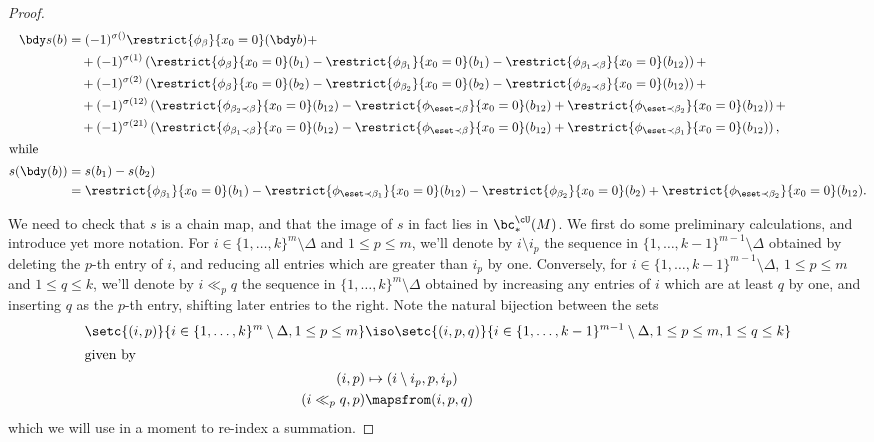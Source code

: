 \begin{proof}
\begin{align*}
\bdy s(b) & =  (-1)^{\sigma()} \restrict{\phi_{\beta}}{x_0 = 0}(\bdy b) + \\
	& \quad + (-1)^{\sigma(1)} \left( \restrict{\phi_{\beta}}{x_0 = 0}(b_1) - \restrict{\phi_{\beta_1}}{x_0 = 0}(b_1) - \restrict{\phi_{\beta_1 \prec \beta}}{x_0 = 0}(b_{12}) \right) + \\
	& \quad + (-1)^{\sigma(2)} \left( \restrict{\phi_{\beta}}{x_0 = 0}(b_2) - \restrict{\phi_{\beta_2}}{x_0 = 0}(b_2) - \restrict{\phi_{\beta_2 \prec \beta}}{x_0 = 0}(b_{12}) \right) + \\
	& \quad + (-1)^{\sigma(12)} \left( \restrict{\phi_{\beta_2 \prec \beta}}{x_0 = 0}(b_{12}) - \restrict{\phi_{\eset \prec \beta}}{x_0 = 0}(b_{12}) + \restrict{\phi_{\eset \prec \beta_2}}{x_0 = 0}(b_{12}) \right) + \\ 
	& \quad + (-1)^{\sigma(21)} \left( \restrict{\phi_{\beta_1 \prec \beta}}{x_0 = 0}(b_{12}) - \restrict{\phi_{\eset  \prec \beta}}{x_0 = 0}(b_{12}) + \restrict{\phi_{\eset \prec \beta_1}}{x_0 = 0}(b_{12}) \right), \\
\intertext{while}
s(\bdy(b)) & = s(b_1) - s(b_2) \\
		& = \restrict{\phi_{\beta_1}}{x_0=0}(b_1) - \restrict{\phi_{\eset \prec \beta_1}}{x_0=0}(b_{12}) - \restrict{\phi_{\beta_2}}{x_0=0}(b_2) + \restrict{\phi_{\eset \prec \beta_2}}{x_0=0}(b_{12}) .
\end{align*}

We need to check that $s$ is a chain map, and that \todo{} the image of $s$ in fact lies in $\bc^{\cU}_*(M)$.
We first do some preliminary calculations, and introduce yet more notation. For $i \in \{1, \ldots, k\}^{m} \setminus \Delta$ and $1 \leq p \leq m$, we'll denote by $i \setminus i_p$ the sequence in $\{1, \ldots, k-1\}^{m-1} \setminus \Delta$ obtained by deleting the $p$-th entry of $i$, and reducing all entries which are greater than $i_p$ by one. Conversely, for $i \in \{1, \ldots, k-1\}^{m-1} \setminus \Delta$, $1 \leq p \leq m$ and $1 \leq q \leq k$, we'll denote by $i \ll_p q$ the sequence in $\{1, \ldots, k\}^{m} \setminus \Delta$ obtained by increasing any entries of $i$ which are at least $q$ by one, and inserting $q$ as the $p$-th entry, shifting later entries to the right. Note the natural bijection between the sets
\begin{align}
\setc{(i,p)}{i \in \{1, \ldots, k\}^{m} \setminus \Delta, 1 \leq p \leq m} & \iso \setc{(i,p,q)}{i \in \{1, \ldots, k-1\}^{m-1} \setminus \Delta, 1 \leq p \leq m, 1 \leq q \leq k} \notag \\ 
\intertext{given by}
(i, p) & \mapsto (i \setminus i_p, p, i_p) \label{eq:reindexing-bijection} \\
(i \ll_p q, p) & \mapsfrom (i,p,q) \notag
\end{align}
which we will use in a moment to re-index a summation.


\end{proof}
